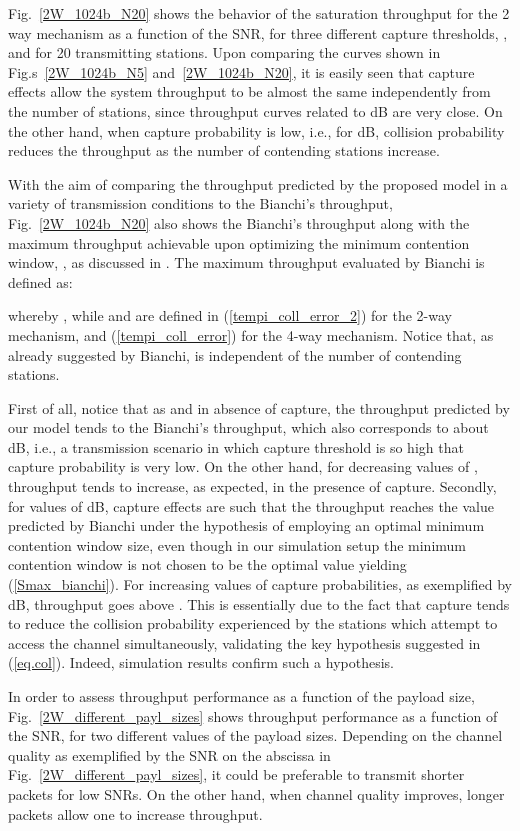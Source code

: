 \documentclass[10pt,onecolumn,a4paper]{IEEEtran}
\begin{document}
Fig.~\ref{2W_1024b_N20} shows the behavior of the saturation
throughput for the 2 way mechanism as a function of the SNR, for
three different capture thresholds, , and for 20 transmitting
stations. Upon comparing the curves shown in
Fig.s~\ref{2W_1024b_N5} and~\ref{2W_1024b_N20}, it is easily seen
that capture effects allow the system throughput to be almost the
same independently from the number of stations, since throughput
curves related to  dB are very close. On the other hand,
when capture probability is low, i.e., for dB, collision
probability reduces the throughput as the number of
contending stations increase.

With the aim of comparing the throughput predicted by the proposed
model in a variety of transmission conditions to the Bianchi's
throughput, Fig.~\ref{2W_1024b_N20} also shows the Bianchi's
throughput along with the maximum throughput  achievable upon
optimizing the minimum contention window, , as discussed in
\cite{Bianchi}. The maximum throughput evaluated by Bianchi is
defined as:

whereby , while  and  are
defined in (\ref{tempi_coll_error_2}) for the 2-way mechanism, and
(\ref{tempi_coll_error}) for the 4-way mechanism. Notice that, as
already suggested by Bianchi,  is independent of the number
 of contending stations.

First of all, notice that as  and in absence
of capture, the throughput predicted by our model tends to the
Bianchi's throughput, which also corresponds to about dB,
i.e., a transmission scenario in which capture threshold is so
high that capture probability is very low. On the other hand, for
decreasing values of , throughput tends to increase, as
expected, in the presence of capture. Secondly, for values of
dB, capture effects are such that the throughput reaches
the value  predicted by Bianchi under the hypothesis of
employing an optimal minimum contention window size, even though
in our simulation setup the minimum contention window is not
chosen to be the optimal value yielding (\ref{Smax_bianchi}). For
increasing values of capture probabilities, as exemplified by
dB, throughput goes above . This is essentially due to
the fact that capture tends to reduce the collision probability
experienced by the stations which attempt to access the channel simultaneously,
validating the key hypothesis suggested in
(\ref{eq.col}). Indeed, simulation results confirm such a
hypothesis.


In order to assess throughput performance as a function of the
payload size, Fig.~\ref{2W_different_payl_sizes} shows throughput
performance as a function of the SNR, for two different values of
the payload sizes. Depending on the channel quality as exemplified
by the SNR on the abscissa in Fig.~\ref{2W_different_payl_sizes},
it could be preferable to transmit shorter packets for low SNRs.
On the other hand, when channel quality improves, longer packets
allow one to increase throughput.
\end{document}
